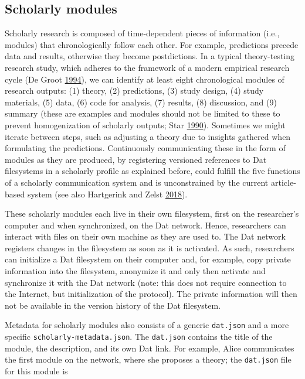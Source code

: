 \documentclass[a5paper]{book}
\begin{document}
\subsection{Scholarly modules}\label{scholarly-modules}

Scholarly research is composed of time-dependent pieces of information
(i.e., modules) that chronologically follow each other. For example,
predictions precede data and results, otherwise they become
postdictions. In a typical theory-testing research study, which adheres
to the framework of a modern empirical research cycle (De Groot
\protect\hyperlink{ref-isbn:9789023228912}{1994}), we can identify at
least eight chronological modules of research outputs: (1) theory, (2)
predictions, (3) study design, (4) study materials, (5) data, (6) code
for analysis, (7) results, (8) discussion, and (9) summary (these are
examples and modules should not be limited to these to prevent
homogenization of scholarly outputs; Star
\protect\hyperlink{ref-doi:10.1111ux2fj.1467-954x.1990.tb03347.x}{1990}).
Sometimes we might iterate between steps, such as adjusting a theory due
to insights gathered when formulating the predictions. Continuously
communicating these in the form of modules as they are produced, by
registering versioned references to Dat filesystems in a scholarly
profile as explained before, could fulfill the five functions of a
scholarly communication system and is unconstrained by the current
article-based system (see also Hartgerink and Zelst
\protect\hyperlink{ref-doi:10.3390ux2fpublications6020021}{2018}).

These scholarly modules each live in their own filesystem, first on the
researcher's computer and when synchronized, on the Dat network. Hence,
researchers can interact with files on their own machine as they are
used to. The Dat network registers changes in the filesystem as soon as
it is activated. As such, researchers can initialize a Dat filesystem on
their computer and, for example, copy private information into the
filesystem, anonymize it and only then activate and synchronize it with
the Dat network (note: this does not require connection to the Internet,
but initialization of the protocol). The private information will then
not be available in the version history of the Dat filesystem.

Metadata for scholarly modules also consists of a generic
\texttt{dat.json} and a more specific \texttt{scholarly-metadata.json}.
The \texttt{dat.json} contains the title of the module, the description,
and its own Dat link. For example, Alice communicates the first module
on the network, where she proposes a theory; the \texttt{dat.json} file
for this module is
\end{document}
